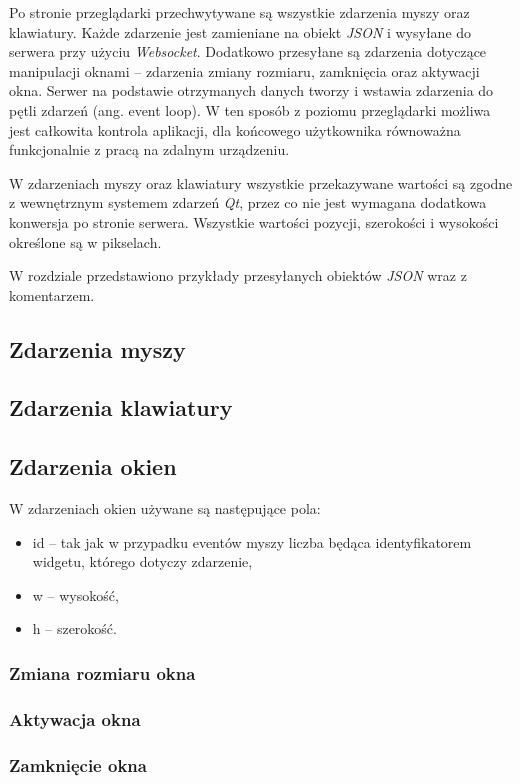 Po stronie przeglądarki przechwytywane są wszystkie zdarzenia myszy oraz klawiatury. Każde zdarzenie jest zamieniane na obiekt \emph{JSON} i wysyłane do serwera przy użyciu \emph{Websocket}. Dodatkowo przesyłane są zdarzenia dotyczące manipulacji oknami -- zdarzenia zmiany rozmiaru, zamknięcia oraz aktywacji okna. Serwer na podstawie otrzymanych danych tworzy i wstawia zdarzenia do pętli zdarzeń (ang. event loop). W ten sposób z poziomu przeglądarki możliwa jest całkowita kontrola aplikacji, dla końcowego użytkownika równoważna funkcjonalnie z pracą na zdalnym urządzeniu.

W zdarzeniach myszy oraz klawiatury wszystkie przekazywane wartości są zgodne z wewnętrznym systemem zdarzeń \emph{Qt}, przez co nie jest wymagana dodatkowa konwersja po stronie serwera. Wszystkie wartości pozycji, szerokości i wysokości określone są w pikselach.

W rozdziale przedstawiono przykłady przesyłanych obiektów \emph{JSON} wraz z komentarzem.

\subsection{Zdarzenia myszy}



\subsection{Zdarzenia klawiatury}


\subsection{Zdarzenia okien}

W zdarzeniach okien używane są następujące pola:
\begin{itemize}
\item id -- tak jak w przypadku eventów myszy liczba będąca identyfikatorem widgetu, którego dotyczy zdarzenie,
\item w -- wysokość,
\item h -- szerokość.
\end{itemize}

\subsubsection{Zmiana rozmiaru okna}


\subsubsection{Aktywacja okna}


\subsubsection{Zamknięcie okna}

